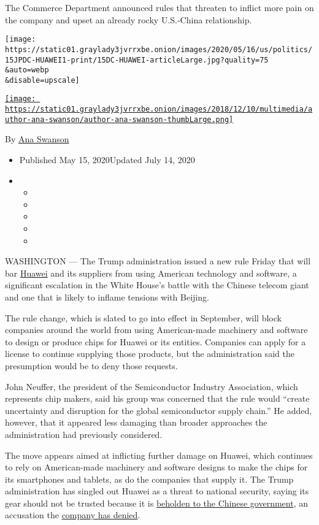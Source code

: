 The Commerce Department announced rules that threaten to inflict more
pain on the company and upset an already rocky U.S.-China relationship.

\texttt{[image: https://static01.graylady3jvrrxbe.onion/images/2020/05/16/us/politics/15JPDC-HUAWEI1-print/15DC-HUAWEI-articleLarge.jpg?quality=75\\\&auto=webp\\\&disable=upscale]}

\href{https://www.nytimes3xbfgragh.onion/by/ana-swanson}{\texttt{[image: https://static01.graylady3jvrrxbe.onion/images/2018/12/10/multimedia/author-ana-swanson/author-ana-swanson-thumbLarge.png]}}

By \href{https://www.nytimes3xbfgragh.onion/by/ana-swanson}{Ana Swanson}

\begin{itemize}
\item
  Published May 15, 2020Updated July 14, 2020
\item
  \begin{itemize}
  \item
  \item
  \item
  \item
  \item
  \end{itemize}
\end{itemize}

WASHINGTON --- The Trump administration issued a new rule Friday that
will bar
\href{https://www.nytimes3xbfgragh.onion/2020/07/14/business/huawei-uk-5g.html}{Huawei}
and its suppliers from using American technology and software, a
significant escalation in the White House's battle with the Chinese
telecom giant and one that is likely to inflame tensions with Beijing.

The rule change, which is slated to go into effect in September, will
block companies around the world from using American-made machinery and
software to design or produce chips for Huawei or its entities.
Companies can apply for a license to continue supplying those products,
but the administration said the presumption would be to deny those
requests.

John Neuffer, the president of the Semiconductor Industry Association,
which represents chip makers, said his group was concerned that the rule
would ``create uncertainty and disruption for the global semiconductor
supply chain.'' He added, however, that it appeared less damaging than
broader approaches the administration had previously considered.

The move appears aimed at inflicting further damage on Huawei, which
continues to rely on American-made machinery and software designs to
make the chips for its smartphones and tablets, as do the companies that
supply it. The Trump administration has singled out Huawei as a threat
to national security, saying its gear should not be trusted because it
is
\href{https://www.nytimes3xbfgragh.onion/2020/02/11/us/politics/white-house-huawei-back-door.html}{beholden
to the Chinese government}, an accusation the
\href{https://www.nytimes3xbfgragh.onion/2019/01/15/technology/huawei-ren-zhengfei.html}{company
has denied}.

